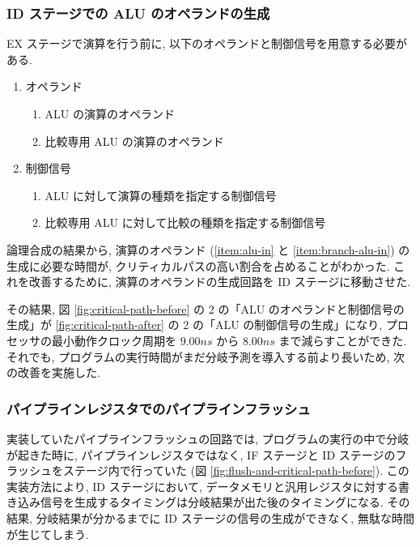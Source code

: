\documentclass[../improvements.tex]{subfiles}
\begin{document}
  \subsubsection{ID ステージでの ALU のオペランドの生成} \label{subsubsection:ex-to-id}
  EX ステージで演算を行う前に, 以下のオペランドと制御信号を用意する必要がある.
  \begin{enumerate}
    \item オペランド
      \begin{enumerate}
        \item ALU の演算のオペランド \label{item:alu-in}
        \item 比較専用 ALU の演算のオペランド \label{item:branch-alu-in}
      \end{enumerate}
    \item 制御信号
      \begin{enumerate}
        \item ALU に対して演算の種類を指定する制御信号 \label{item:alu-op}
        \item 比較専用 ALU に対して比較の種類を指定する制御信号 \label{item:branch-alu-op}
      \end{enumerate}
  \end{enumerate}
  論理合成の結果から, 演算のオペランド (\ref{item:alu-in} と \ref{item:branch-alu-in}) の生成に必要な時間が, 
  クリティカルパスの高い割合を占めることがわかった.
  これを改善するために, 演算のオペランドの生成回路を ID ステージに移動させた.

  その結果, 図 \ref{fig:critical-path-before} の 2 の「ALU のオペランドと制御信号の生成」が
  \ref{fig:critical-path-after} の 2 の「ALU の制御信号の生成」になり, 
  プロセッサの最小動作クロック周期を $9.00\unit{ns}$ から $8.00\unit{ns}$ まで減らすことができた.
  それでも, プログラムの実行時間がまだ分岐予測を導入する前より長いため, 次の改善を実施した.

  \subsubsection{パイプラインレジスタでのパイプラインフラッシュ} \label{subsubsection:rethink-flush}
  実装していたパイプラインフラッシュの回路では, プログラムの実行の中で分岐が起きた時に, 
  パイプラインレジスタではなく, IF ステージと ID ステージのフラッシュをステージ内で行っていた (図 \ref{fig:flush-and-critical-path-before}).
  この実装方法により, ID ステージにおいて, データメモリと汎用レジスタに対する書き込み信号を生成するタイミングは分岐結果が出た後のタイミングになる.
  その結果, 分岐結果が分かるまでに ID ステージの信号の生成ができなく, 無駄な時間が生じてしまう.
\end{document}
